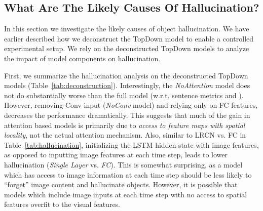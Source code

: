 %
\subsection{What Are The Likely Causes Of Hallucination?}
\label{sec:causes}
%
%
%
%

In this section we investigate the likely causes of object hallucination. We have earlier described how we deconstruct the TopDown model to enable a controlled experimental setup. We rely on the deconstructed TopDown models to analyze the impact of model components on hallucination.

First, we summarize the hallucination analysis on the deconstructed TopDown models (Table~\ref{tab:deconstruction}).
%
%
Interestingly, the \textit{NoAttention} model does not do substantially worse than the full model (w.r.t. sentence metrics and \metric{}).
However, removing Conv input (\textit{NoConv} model) and relying only on FC features, decreases the performance dramatically.
This suggests that much of the gain in attention based models is primarily due to \emph{access to feature maps with spatial locality}, not the actual attention mechanism.
Also, similar to LRCN vs. FC in Table~\ref{tab:hallucination}, initializing the LSTM hidden state with image features, as opposed to inputting image features at each time step, leads to lower hallucination (\textit{Single Layer} vs. \textit{FC}). 
%
This is somewhat surprising, as a model which has access to image information at each time step should be less likely to ``forget'' image content and hallucinate objects. However, it is possible that models which include image inputs at each time step with no access to spatial features overfit to the visual features.%
%
%

%

\begin{table}
\centering
{}
%
%
%
%
%
%
%
%
%
%
%
%
%
%
%
%
%
\caption{\small Hallucination analysis on deconstructed TopDown models with sentence metrics SPICE (S), METEOR (M), and CIDEr (C), \metric{}s (sentence level, CHs) and \metric{}i (instance level, CHi). See Section~\ref{sec:causes}.}
\label{tab:deconstruction}
\end{table}

